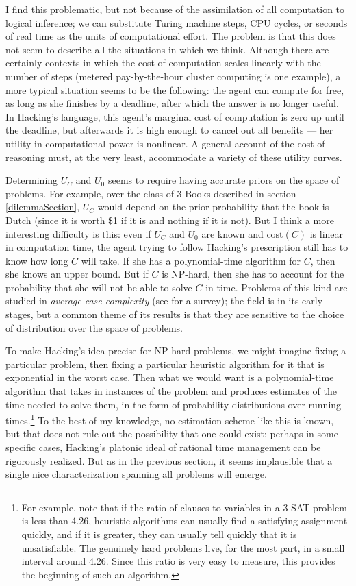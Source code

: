 \documentclass[letterpaper,12pt]{article}
\begin{document}
I find this problematic, but not because of the assimilation of all computation to logical inference; we can substitute Turing machine steps, CPU cycles, or seconds of real time as the units of computational effort. The problem is that this does not seem to describe all the situations in which we think. Although there are certainly contexts in which the cost of computation scales linearly with the number of steps (metered pay-by-the-hour cluster computing is one example), a more typical situation seems to be the following: the agent can compute for free, as long as she finishes by a deadline, after which the answer is no longer useful. In Hacking's language, this agent's marginal cost of computation is zero up until the deadline, but afterwards it is high enough to cancel out all benefits --- her utility in computational power is nonlinear. A general account of the cost of reasoning must, at the very least, accommodate a variety of these utility curves.

Determining $U_C$ and $U_0$ seems to require having accurate priors on the space of problems. For example, over the class of 3-Books described in section \ref{dilemmaSection}, $U_C$ would depend on the prior probability that the book is Dutch (since it is worth \$1 if it is and nothing if it is not).  But I think a more interesting difficulty is this: even if $U_C$ and $U_0$ are known and $\text{cost}(C)$ is linear in computation time, the agent trying to follow Hacking's prescription still has to know how long $C$ will take. If she has a polynomial-time algorithm for $C$, then she knows an upper bound. But if $C$ is NP-hard, then she has to account for the probability that she will not be able to solve $C$ in time. Problems of this kind are studied in \emph{average-case complexity} (see \cite{DBLP:journals/eccc/BogdanovT06} for a survey); the field is in its early stages, but a common theme of its results is that they are sensitive to the choice of distribution over the space of problems.

To make Hacking's idea precise for NP-hard problems, we might imagine fixing a particular problem, then fixing a particular heuristic algorithm for it that is exponential in the worst case. Then what we would want is a polynomial-time algorithm that takes in instances of the problem and produces estimates of the time needed to solve them, in the form of probability distributions over running times.\footnote{For example, \cite{Coarfa00random3-sat} note that if the ratio of clauses to variables in a 3-SAT problem is less than 4.26, heuristic algorithms can usually find a satisfying assignment quickly, and if it is greater, they can usually tell quickly that it is unsatisfiable. The genuinely hard problems live, for the most part, in a small interval around 4.26. Since this ratio is very easy to measure, this provides the beginning of such an algorithm.} To the best of my knowledge, no estimation scheme like this is known, but that does not rule out the possibility that one could exist; perhaps in some specific cases, Hacking's platonic ideal of rational time management can be rigorously realized. But as in the previous section, it seems implausible that a single nice characterization spanning all problems will emerge.
\end{document}
